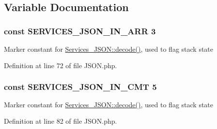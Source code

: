 \subsection{Variable Documentation}
\hypertarget{_j_s_o_n_8php_a800e29918ef4103a764768fd9fba3f76}{
\subsubsection[{S\+E\+R\+V\+I\+C\+E\+S\+\_\+\+J\+S\+O\+N\+\_\+\+I\+N\+\_\+\+A\+R\+R}]{\setlength{\rightskip}{0pt plus 5cm}const S\+E\+R\+V\+I\+C\+E\+S\+\_\+\+J\+S\+O\+N\+\_\+\+I\+N\+\_\+\+A\+R\+R 3}}\label{_j_s_o_n_8php_a800e29918ef4103a764768fd9fba3f76}
Marker constant for \hyperlink{class_services___j_s_o_n_a4afbb486f4a5ff5a8170c832f5997986}{Services\+\_\+\+J\+S\+O\+N\+::decode()}, used to flag stack state 

Definition at line 72 of file J\+S\+O\+N.\+php.

\hypertarget{_j_s_o_n_8php_a6061c244fdf8c7c5d6423814af6ecb07}{
\subsubsection[{S\+E\+R\+V\+I\+C\+E\+S\+\_\+\+J\+S\+O\+N\+\_\+\+I\+N\+\_\+\+C\+M\+T}]{\setlength{\rightskip}{0pt plus 5cm}const S\+E\+R\+V\+I\+C\+E\+S\+\_\+\+J\+S\+O\+N\+\_\+\+I\+N\+\_\+\+C\+M\+T 5}}\label{_j_s_o_n_8php_a6061c244fdf8c7c5d6423814af6ecb07}
Marker constant for \hyperlink{class_services___j_s_o_n_a4afbb486f4a5ff5a8170c832f5997986}{Services\+\_\+\+J\+S\+O\+N\+::decode()}, used to flag stack state 

Definition at line 82 of file J\+S\+O\+N.\+php.

